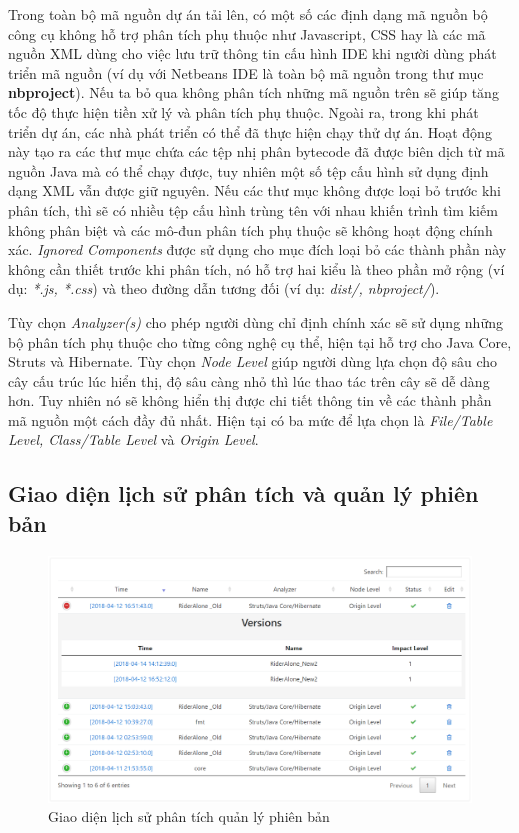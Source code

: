 \documentclass[12pt]{report}
\begin{document}
Trong toàn bộ mã nguồn dự án tải lên, có một số các định dạng mã nguồn bộ công cụ không hỗ trợ phân tích phụ thuộc như Javascript, CSS hay là các mã nguồn XML dùng cho việc lưu trữ thông tin cấu hình IDE khi người dùng phát triển mã nguồn (ví dụ với Netbeans IDE là toàn bộ mã nguồn trong thư mục \textbf{nbproject}). Nếu ta bỏ qua không phân tích những mã nguồn trên sẽ giúp tăng tốc độ thực hiện tiền xử lý và phân tích phụ thuộc. Ngoài ra, trong khi phát triển dự án, các nhà phát triển có thể đã thực hiện chạy thử dự án. Hoạt động này tạo ra các thư mục chứa các tệp nhị phân bytecode đã được biên dịch từ mã nguồn Java mà có thể chạy được, tuy nhiên một số tệp cấu hình sử dụng định dạng XML vẫn được giữ nguyên. Nếu các thư mục không được loại bỏ trước khi phân tích, thì sẽ có nhiều tệp cấu hình trùng tên với nhau khiến trình tìm kiếm không phân biệt và các mô-đun phân tích phụ thuộc sẽ không hoạt động chính xác. \textit{Ignored Components} được sử dụng cho mục đích loại bỏ các thành phần này không cần thiết trước khi phân tích, nó hỗ trợ hai kiểu là theo phần mở rộng (ví dụ: \textit{*.js, *.css}) và theo đường dẫn tương đối (ví dụ: \textit{dist/, nbproject/}).

Tùy chọn \textit{Analyzer(s)} cho phép người dùng chỉ định chính xác sẽ sử dụng những bộ phân tích phụ thuộc cho từng công nghệ cụ thể, hiện tại hỗ trợ cho Java Core, Struts và Hibernate. Tùy chọn \textit{Node Level} giúp người dùng lựa chọn độ sâu cho cây cấu trúc lúc hiển thị, độ sâu càng nhỏ thì lúc thao tác trên cây sẽ dễ dàng hơn. Tuy nhiên nó sẽ không hiển thị được chi tiết thông tin về các thành phần mã nguồn một cách đầy đủ nhất. Hiện tại có ba mức để lựa chọn là \textit{File/Table Level, Class/Table Level} và \textit{Origin Level}.

\subsection{Giao diện lịch sử phân tích và quản lý phiên bản}
\begin{figure}[h]
	\centering
	\includegraphics[width=0.9\linewidth]{jcia-history}
	\caption{Giao diện lịch sử phân tích quản lý phiên bản}
	\label{fig:jcia-history}
\end{figure}
\end{document}
